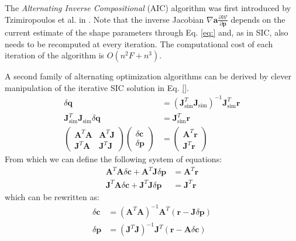 The \emph{Alternating Inverse Compositional} (AIC) algorithm was first introduced by Tzimiropoulos et al. in \cite{Tzimiropoulos2012}. Note that the inverse Jacobian $\nabla \mathbf{a} \frac{\partial\mathcal{W}}{\partial\mathbf{p}}$ depends on the current estimate of the shape parameters through Eq. \ref{eq:} and, as in SIC, also needs to be recomputed at every iteration. The computational cost of each iteration of the algorithm is $O(n^2F + n^3)$.

A second family of alternating optimization algorithms can be derived by clever manipulation of the iterative SIC solution in Eq. \ref{}.
\begin{equation}
    \begin{align}
        \delta\mathbf{q} & =  \left( \mathbf{J}_\text{sim}^T\mathbf{J}_\text{sim} \right)^{-1} \mathbf{J}_\text{sim}^T \mathbf{r}
        \\
        \mathbf{J}_\text{sim}^T\mathbf{J}_\text{sim} \delta\mathbf{q} & = \mathbf{J}_\text{sim}^T \mathbf{r} 
        \\
        \begin{pmatrix}
            \mathbf{A}^T\mathbf{A} & \mathbf{A}^T\mathbf{J} 
            \\ 
            \mathbf{J}^T\mathbf{A} & \mathbf{J}^T\mathbf{J} 
        \end{pmatrix}
        \begin{pmatrix}
            \delta\mathbf{c} 
            \\ 
            \delta\mathbf{p}
        \end{pmatrix}
        & = 
        \begin{pmatrix}
            \mathbf{A}^T\mathbf{r} 
            \\ 
            \mathbf{J}^T\mathbf{r} 
        \end{pmatrix}
    \label{eq:fastsim_solution}
    \end{align}
\end{equation}
From which we can define the following system of equations:
\begin{equation}
    \begin{align}
        \mathbf{A}^T\mathbf{A} \delta\mathbf{c} + \mathbf{A}^T\mathbf{J} \delta\mathbf{p} & = \mathbf{A}^T \mathbf{r} 
        \\
        \mathbf{J}^T\mathbf{A} \delta\mathbf{c} + \mathbf{J}^T\mathbf{J} \delta\mathbf{p} & = \mathbf{J}^T \mathbf{r}
    \label{eq:fastsim_system}
    \end{align}
\end{equation}
which can be rewritten as:
\begin{equation}
    \begin{align}
        \delta\mathbf{c} & = (\mathbf{A}^T\mathbf{A})^{-1} \mathbf{A}^T \left( \mathbf{r} - \mathbf{J} \delta\mathbf{p} \right) 
        \\
        \delta\mathbf{p} & = (\mathbf{J}^T\mathbf{J})^{-1} \mathbf{J}^T \left( \mathbf{r} - \mathbf{A} \delta\mathbf{c} \right)
    \label{eq:fastsim_system}
    \end{align}
\end{equation}
